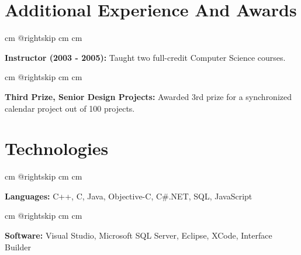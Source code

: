 \documentclass[10pt, letterpaper]{article}
\begin{document}
    
    \section{Additional Experience And Awards}

        \begingroup{} cm
        \advance\csname @rightskip cm
        \advance{} cm

        \textbf{Instructor (2003 - 2005):} Taught two full-credit Computer Science courses. \par\endgroup

        \vspace{0.2 cm}
        \begingroup{} cm
        \advance\csname @rightskip cm
        \advance{} cm

        \textbf{Third Prize, Senior Design Projects:} Awarded 3rd prize for a synchronized calendar project out of 100 projects. \par\endgroup


    
    \section{Technologies}

        \begingroup{} cm
        \advance\csname @rightskip cm
        \advance{} cm

        \textbf{Languages:} C++, C, Java, Objective-C, C\#.NET, SQL, JavaScript \par\endgroup

        \vspace{0.2 cm}
        \begingroup{} cm
        \advance\csname @rightskip cm
        \advance{} cm

        \textbf{Software:} Visual Studio, Microsoft SQL Server, Eclipse, XCode, Interface Builder \par\endgroup


    
\end{document}
